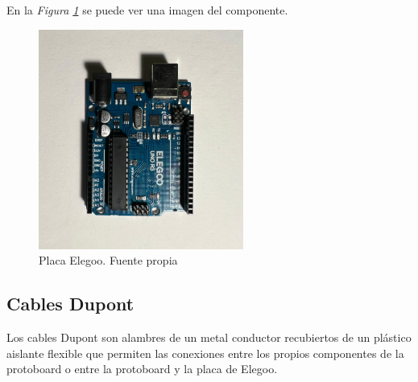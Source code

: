 En la \textit{Figura \ref{fig:Placa Elegoo}} se puede ver una imagen del componente.
\begin{figure}[h]
        \centering
        \includegraphics[angle=90,width=0.6\textwidth]{img/placa elegoo.png}
        \caption{Placa Elegoo. Fuente propia}
        \label{fig:Placa Elegoo}
    \end{figure}

\subsection{Cables Dupont}
Los cables Dupont son alambres de un metal conductor recubiertos de un plástico aislante flexible que permiten las conexiones entre los propios componentes de la protoboard o entre la protoboard y la placa de Elegoo. 

